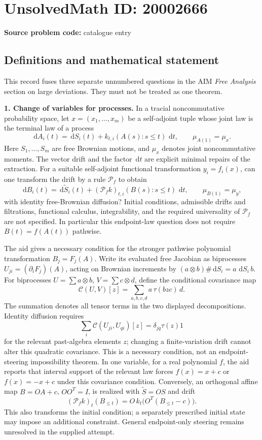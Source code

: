 \documentclass[11pt]{article}
\newcommand{\dd}{\,\mathrm{d}}
\begin{document}
\section*{UnsolvedMath ID: 20002666}
\textbf{Source problem code:} catalogue entry
\subsection{Definitions and mathematical statement}
This record fuses three separate unnumbered questions in the AIM \emph{Free Analysis} section on large deviations. They must not be treated as one theorem.

\textbf{1. Change of variables for processes.} In a tracial noncommutative probability space, let \(x=(x_1,\ldots,x_m)\) be a self-adjoint tuple whose joint law is the terminal law of a process
\[
 \dd A_i(t)=\dd S_i(t)+k_{t,i}(A(s):s\le t)\,\dd t,
 \qquad \mu_{A(1)}=\mu_x.
\]
Here \(S_1,\ldots,S_m\) are free Brownian motions, and \(\mu_x\) denotes joint noncommutative moments. The vector drift and the factor \(\dd t\) are explicit minimal repairs of the extraction. For a suitable self-adjoint functional transformation \(y_i=f_i(x)\), can one transform the drift by a rule \(\mathcal P_f\) to obtain
\[
 \dd B_i(t)=\dd\widetilde S_i(t)
       +(\mathcal P_f k)_{t,i}(B(s):s\le t)\,\dd t,
 \qquad \mu_{B(1)}=\mu_y,
\]
with identity free-Brownian diffusion? Initial conditions, admissible drifts and filtrations, functional calculus, integrability, and the required universality of \(\mathcal P_f\) are not specified. In particular this endpoint-law question does not require \(B(t)=f(A(t))\) pathwise.

The aid gives a necessary condition for the stronger pathwise polynomial transformation \(B_j=F_j(A)\). Write its evaluated free Jacobian as biprocesses \(U_{ji}=(\partial_iF_j)(A)\), acting on Brownian increments by \((a\otimes b)\#\dd S_i=a\,\dd S_i\,b\). For biprocesses \(U=\sum a\otimes b\), \(V=\sum c\otimes d\), define the conditional covariance map
\[
 \mathcal C(U,V)[z]=\sum_{a,b,c,d}a\,\tau(bzc)\,d.
\]
The summation denotes all tensor terms in the two displayed decompositions. Identity diffusion requires
\[
 \sum_i\mathcal C(U_{ji},U_{qi})[z]
       =\delta_{jq}\tau(z)1
\]
for the relevant past-algebra elements \(z\); changing a finite-variation drift cannot alter this quadratic covariance. This is a necessary condition, not an endpoint-steering impossibility theorem. In one variable, for a real polynomial \(f\), the aid reports that interval support of the relevant law forces \(f(x)=x+c\) or \(f(x)=-x+c\) under this covariance condition. Conversely, an orthogonal affine map \(B=OA+c\), \(OO^T=I\), is realized with \(\widetilde S=OS\) and drift
\[
 (\mathcal P_f k)_t(B_{\le t})
       =O\,k_t\bigl(O^T(B_{\le t}-c)\bigr).
\]
This also transforms the initial condition; a separately prescribed initial state may impose an additional constraint. General endpoint-only steering remains unresolved in the supplied attempt.
\end{document}
